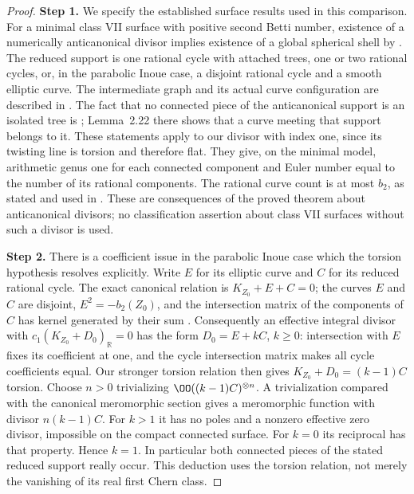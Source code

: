 \begin{proof}
\noindent\textbf{Step 1.} We specify the established surface results used in this
comparison. For a minimal class VII surface with positive
second Betti number, existence of a numerically
anticanonical divisor implies existence of a global
spherical shell by
\cite[Theorem~0.2, Proposition~2.29 and Theorem~2.38]{Dloussky2006}.
The reduced support is one rational cycle with attached
trees, one or two rational cycles, or, in the parabolic
Inoue case, a disjoint rational cycle and a smooth elliptic
curve. The intermediate graph and its actual curve
configuration are described in
\cite[\S1, pp.~284--285, and \S3, p.~296]{DOT2003}.
The fact that no connected piece of the anticanonical
support is an isolated tree is
\cite[Corollary~2.25 and Proposition~2.27]{Dloussky2006};
Lemma~2.22 there shows that a curve meeting that support
belongs to it. These statements apply to our divisor with
index one, since its twisting line is torsion and therefore
flat. They give, on the minimal model, arithmetic genus
one for each connected component and Euler number equal
to the number of its rational components. The rational
curve count is at most $b_2$, as stated and used in
\cite[Introduction, p.~283]{DOT2003}.
These are consequences of the proved theorem about
anticanonical divisors; no classification assertion about
class VII surfaces without such a divisor is used.

\noindent\textbf{Step 2.} There is a coefficient issue in the parabolic Inoue case
which the torsion hypothesis resolves explicitly. Write
$E$ for its elliptic curve and $C$ for its reduced rational
cycle. The exact canonical relation is
$K_{Z_0}+E+C=0$; the curves $E$ and $C$ are disjoint,
$E^2=-b_2(Z_0)$, and the intersection matrix of the
components of $C$ has kernel generated by their sum
\cite[Lemma~2.22 and the following paragraph; Proposition~2.27]{Dloussky2006}.
Consequently an effective integral divisor with
$c_1(K_{Z_0}+D_0)_{\mathbb R}=0$ has the form
$D_0=E+kC$, $k\ge0$: intersection with $E$ fixes its
coefficient at one, and the cycle intersection matrix
makes all cycle coefficients equal. Our stronger
torsion relation then gives
$K_{Z_0}+D_0=(k-1)C$ torsion. Choose $n>0$ trivializing $\OO((k-1)C)^{\otimes n}$.
A trivialization compared with the canonical meromorphic
section gives a meromorphic function with divisor
$n(k-1)C$. For $k>1$ it has no poles and a nonzero
effective zero divisor, impossible on the compact
connected surface. For $k=0$ its reciprocal has that
property. Hence $k=1$. In particular both connected
pieces of the stated reduced support really occur.
This deduction uses the torsion relation, not merely
the vanishing of its real first Chern class.


\end{proof}
